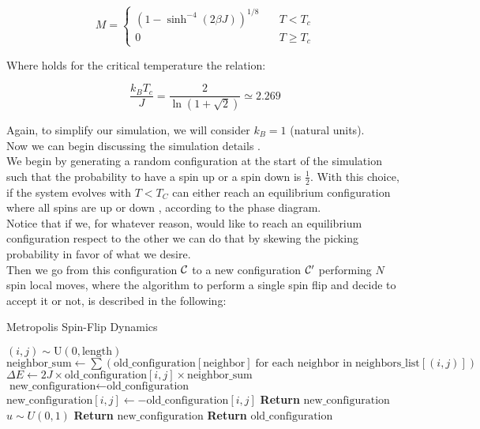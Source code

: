$$
M = 
\begin{cases}
(1-\sinh^{-4}(2\beta J))^{1/8} \quad&T<T_c\\
0 &T \geq T_c    
\end{cases}
$$

Where holds for the critical temperature the relation:

$$ \frac{k_BT_c}{J} = \frac{2}{\ln(1 +\sqrt{2})} \simeq 2.269 $$

Again, to simplify our simulation, we will consider $k_B = 1$ (natural units). \\

Now we can begin discussing the simulation details .\\
We begin by generating a random configuration at the start of the simulation such that the probability to have a spin up or a spin down is
$\frac{1}{2}$. With this choice, if the system evolves with $T<T_C$ can either reach an equilibrium configuration where all spins are up or down ,
according to the phase diagram. \\
Notice that if we, for whatever reason, would like to reach an equilibrium configuration respect to the other we can do that by skewing
the picking probability in favor of what we desire. \\
Then we go from this configuration $\mathcal{C}$ to a new configuration $\mathcal{C}'$ performing $N$ spin local moves, 
where the algorithm to perform a single spin flip and decide to accept it or not, is described in the following:

\begin{algorithm}
    \caption{Metropolis Spin-Flip Dynamics}
    \begin{algorithmic}[1]
        \State \((i, j) \sim \text{U}(0, \text{length})\)
        \State \(\text{neighbor\_sum} \gets \sum \left( \text{old\_configuration}[\text{neighbor}] \; \text{for each neighbor in} \; \text{neighbors\_list}[(i, j)] \right)\)
        \State \(\Delta E \gets 2J \times \text{old\_configuration}[i, j] \times \text{neighbor\_sum}\)
        \State \(\text{new\_configuration} \gets \text{old\_configuration}\)
        \State \(\text{new\_configuration}[i, j] \gets -\text{old\_configuration}[i, j]\) 
            \State \textbf{Return} \(\text{new\_configuration}\)
        \Else
            \State \(u \sim U(0,1)\)
                \State \textbf{Return} \(\text{new\_configuration}\)
            \Else
                \State \textbf{Return} \(\text{old\_configuration}\)
            \EndIf
        \EndIf
    \end{algorithmic}
    \label{metropolis_spin_flip}
\end{algorithm}

